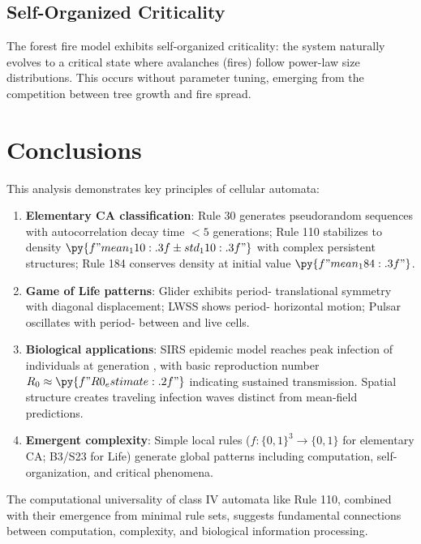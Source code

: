 \documentclass[a4paper, 11pt]{article}
\begin{document}
\subsection{Self-Organized Criticality}

The forest fire model exhibits self-organized criticality: the system naturally evolves to a
critical state where avalanches (fires) follow power-law size distributions. This occurs without
parameter tuning, emerging from the competition between tree growth and fire spread.

\section{Conclusions}

This analysis demonstrates key principles of cellular automata:

\begin{enumerate}
\item \textbf{Elementary CA classification}: Rule 30 generates pseudorandom sequences with
autocorrelation decay time $< 5$ generations; Rule 110 stabilizes to density
$\py{f"{mean_110:.3f} \pm {std_110:.3f}"}$ with complex persistent structures; Rule 184
conserves density at initial value $\py{f"{mean_184:.3f}"}$.

\item \textbf{Game of Life patterns}: Glider exhibits period- translational
symmetry with diagonal displacement; LWSS shows period- horizontal motion;
Pulsar oscillates with period- between  and 
live cells.

\item \textbf{Biological applications}: SIRS epidemic model reaches peak infection of
 individuals at generation , with basic reproduction
number $R_0 \approx \py{f"{R0_estimate:.2f}"}$ indicating sustained transmission. Spatial
structure creates traveling infection waves distinct from mean-field predictions.

\item \textbf{Emergent complexity}: Simple local rules ($f: \{0,1\}^3 \to \{0,1\}$ for
elementary CA; B3/S23 for Life) generate global patterns including computation, self-organization,
and critical phenomena.
\end{enumerate}

The computational universality of class IV automata like Rule 110, combined with their emergence
from minimal rule sets, suggests fundamental connections between computation, complexity, and
biological information processing.
\end{document}
